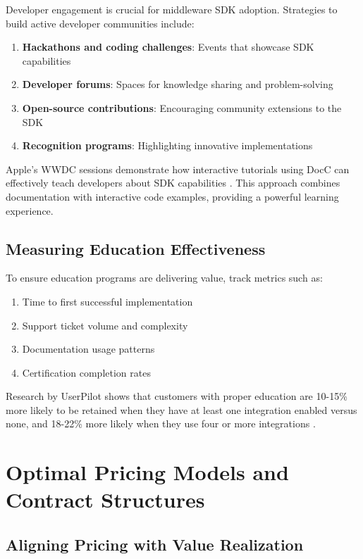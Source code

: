 \documentclass[11pt,a4paper]{article}
\begin{document}
Developer engagement is crucial for middleware SDK adoption. Strategies to build active developer communities include:

\begin{enumerate}
    \item \textbf{Hackathons and coding challenges}: Events that showcase SDK capabilities
    \item \textbf{Developer forums}: Spaces for knowledge sharing and problem-solving
    \item \textbf{Open-source contributions}: Encouraging community extensions to the SDK
    \item \textbf{Recognition programs}: Highlighting innovative implementations
\end{enumerate}

Apple's WWDC sessions demonstrate how interactive tutorials using DocC can effectively teach developers about SDK capabilities \citep{apple2021build}. This approach combines documentation with interactive code examples, providing a powerful learning experience.

\subsection{Measuring Education Effectiveness}

To ensure education programs are delivering value, track metrics such as:

\begin{enumerate}
    \item Time to first successful implementation
    \item Support ticket volume and complexity
    \item Documentation usage patterns
    \item Certification completion rates
\end{enumerate}

Research by UserPilot shows that customers with proper education are 10-15\% more likely to be retained when they have at least one integration enabled versus none, and 18-22\% more likely when they use four or more integrations \citep{Grigoryan2022}.

\section{Optimal Pricing Models and Contract Structures}

\subsection{Aligning Pricing with Value Realization}
\end{document}
